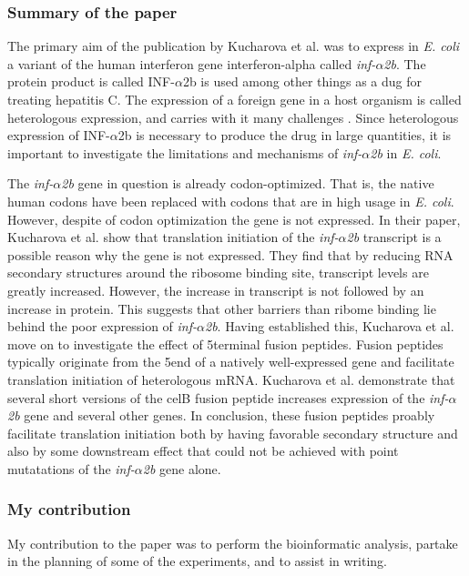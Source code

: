 %
\subsubsection{Summary of the paper}
The primary aim of the publication by Kucharova et al. was to express in
\textit{E. coli} a variant of the human interferon gene interferon-alpha called
\textit{inf-$\alpha$2b}. The protein product is called INF-$\alpha$2b is used
among other things as a dug for treating hepatitis C. The expression of a foreign
gene in a host organism is called heterologous expression, and carries with it
many challenges \cite{gustafsson_codon_2004}. Since heterologous expression of
INF-$\alpha$2b is necessary to produce the drug in large quantities, it is
important to investigate the limitations and mechanisms of
\textit{inf-$\alpha$2b} in \textit{E. coli}.

The \textit{inf-$\alpha$2b} gene in question is already codon-optimized. That
is, the native human codons have been replaced with codons that are in high
usage in \textit{E. coli}. However, despite of codon optimization the gene is
not expressed. In their paper, Kucharova et al. show that translation
initiation of the \textit{inf-$\alpha$2b} transcript is a possible reason why
the gene is not expressed. They find that by reducing RNA secondary structures
around the ribosome binding site, transcript levels are greatly increased.
However, the increase in transcript is not followed by an increase in protein.
This suggests that other barriers than ribome binding lie behind the poor
expression of \textit{inf-$\alpha$2b}. Having established this, Kucharova et
al. move on to investigate the effect of 5\p terminal fusion peptides. Fusion
peptides typically originate from the 5\p end of a natively well-expressed gene
and facilitate translation initiation of heterologous mRNA. Kucharova et al.
demonstrate that several short versions of the celB fusion peptide increases
expression of the \textit{inf-$\alpha$2b} gene and several other genes. In
conclusion, these fusion peptides proably facilitate translation initiation
both by having favorable secondary structure and also by some downstream effect
that could not be achieved with point mutatations of the
\textit{inf-$\alpha$2b} gene alone.

\subsubsection{My contribution}
My contribution to the paper was to perform the bioinformatic analysis, partake
in the planning of some of the experiments, and to assist in writing.

